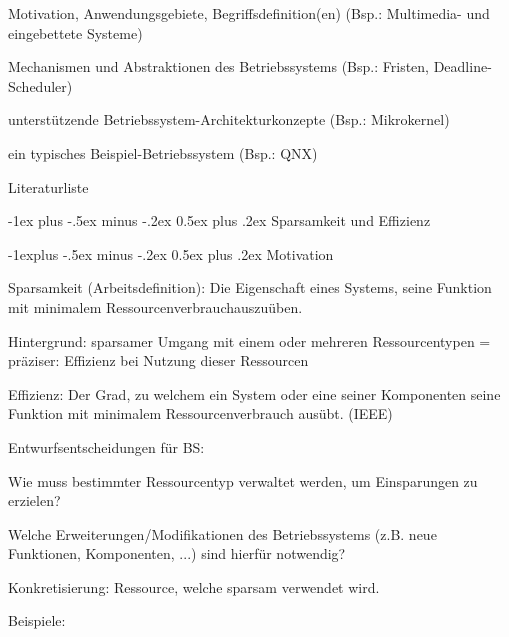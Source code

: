 \documentclass[a4paper]{article}
\makeatletter
\renewcommand{\section}{\@startsection{section}{1}{0mm}%
 {-1ex plus -.5ex minus -.2ex}%
 {0.5ex plus .2ex}%
 {\normalfont\large\bfseries}}
\renewcommand{\subsection}{\@startsection{subsection}{2}{0mm}%
 {-1explus -.5ex minus -.2ex}%
 {0.5ex plus .2ex}%
 {\normalfont\normalsize\bfseries}}
\makeatother
\begin{document}
\begin{multicols}{3}
    \begin{itemize*}
        \item
        Motivation, Anwendungsgebiete, Begriffsdefinition(en) (Bsp.:
        Multimedia- und eingebettete Systeme)
        \item
        Mechanismen und Abstraktionen des Betriebssystems (Bsp.: Fristen,
        Deadline-Scheduler)
        \item
        unterstützende Betriebssystem-Architekturkonzepte (Bsp.: Mikrokernel)
        \item
        ein typisches Beispiel-Betriebssystem (Bsp.: QNX)
        \item
        Literaturliste
    \end{itemize*}


    \section{Sparsamkeit und Effizienz}


    \subsection{Motivation}

    Sparsamkeit (Arbeitsdefinition): Die Eigenschaft eines Systems, seine
    Funktion mit minimalem Ressourcenverbrauchauszuüben.

    Hintergrund: sparsamer Umgang mit einem oder mehreren Ressourcentypen =
    präziser: Effizienz bei Nutzung dieser Ressourcen

    Effizienz: Der Grad, zu welchem ein System oder eine seiner Komponenten
    seine Funktion mit minimalem Ressourcenverbrauch ausübt. (IEEE)

    Entwurfsentscheidungen für BS:

    \begin{enumerate*}
        \item
        Wie muss bestimmter Ressourcentyp verwaltet werden, um Einsparungen zu
        erzielen?
        \item
        Welche Erweiterungen/Modifikationen des Betriebssystems (z.B. neue
        Funktionen, Komponenten, ...) sind hierfür notwendig?
    \end{enumerate*}

    Konkretisierung: Ressource, welche sparsam verwendet wird.

    Beispiele:


\end{multicols}
\end{document}
